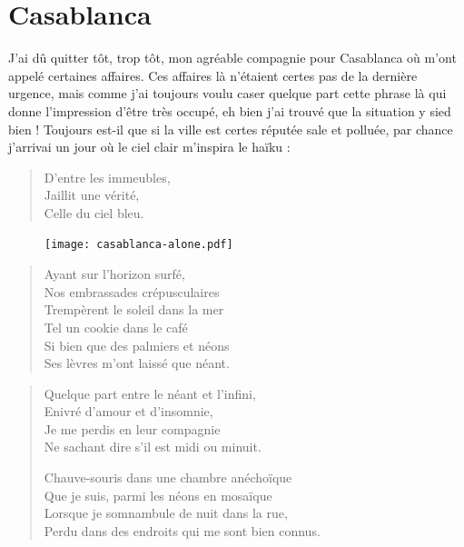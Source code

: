 \section*{Casablanca}


\begin{prose}
J’ai dû quitter tôt, trop tôt, mon agréable compagnie pour Casablanca où m’ont appelé certaines affaires. Ces affaires là n’étaient certes pas de la dernière urgence, mais comme j’ai toujours voulu caser quelque part cette phrase là qui donne l’impression d’être très occupé, eh bien j’ai trouvé que la situation y sied bien ! Toujours est-il que si la ville est certes réputée sale et polluée, par chance j’arrivai un jour où le ciel clair m’inspira le haïku :
\end{prose}

\begin{verse}
D’entre les immeubles,\\
Jaillit une vérité,\\
Celle du ciel bleu.
\end{verse}

\begin{figure}[h]
\centering
\texttt{[image: casablanca-alone.pdf]}
\captionsetup{labelformat=empty}
\caption[Idéotexte de  (\textarabic{البيضاء}.)]{}
\end{figure}

\begin{verse}
Ayant sur l’horizon surfé,\\
Nos embrassades crépusculaires\\
Trempèrent  le soleil dans la mer\\
Tel un cookie dans le café\\
Si bien que des palmiers et néons\\
Ses lèvres m’ont laissé que néant.
\end{verse}

\begin{verse}
Quelque part entre le néant et l’infini,\\
Enivré d’amour et d’insomnie,\\
Je me perdis en leur compagnie\\
Ne sachant dire s’il est midi ou minuit.

Chauve-souris dans une chambre anéchoïque\\
Que je suis, parmi les néons en mosaïque\\
Lorsque je somnambule de nuit dans la rue,\\
Perdu dans des endroits qui me sont bien connus.
\end{verse}

